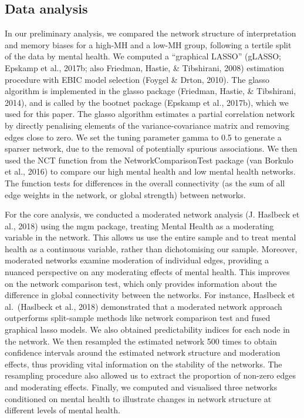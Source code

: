 \documentclass[man,floatsintext]{apa6}
\begin{document}
\hypertarget{data-analysis}{%
\subsection{Data analysis}\label{data-analysis}}

In our preliminary analysis, we compared the network structure of interpretation and memory biases for a high-MH and a low-MH group, following a tertile split of the data by mental health. We computed a \enquote{graphical LASSO} (gLASSO; Epskamp et al., 2017b; also Friedman, Hastie, \& Tibshirani, 2008) estimation procedure with EBIC model selection (Foygel \& Drton, 2010). The glasso algorithm is implemented in the glasso package (Friedman, Hastie, \& Tibshirani, 2014), and is called by the bootnet package (Epskamp et al., 2017b), which we used for this paper. The glasso algorithm estimates a partial correlation network by directly penalising elements of the variance-covariance matrix and removing edges close to zero. We set the tuning parameter gamma to 0.5 to generate a sparser network, due to the removal of potentially spurious associations. We then used the NCT function from the NetworkComparisonTest package (van Borkulo et al., 2016) to compare our high mental health and low mental health networks. The function tests for differences in the overall connectivity (as the sum of all edge weights in the network, or global strength) between networks.

For the core analysis, we conducted a moderated network analysis (J. Haslbeck et al., 2018) using the mgm package, treating Mental Health as a moderating variable in the network. This allows us use the entire sample and to treat mental health as a continuous variable, rather than dichotomising our sample. Moreover, moderated networks examine moderation of individual edges, providing a nuanced perspective on any moderating effects of mental health. This improves on the network comparison test, which only provides information about the difference in global connectivity between the networks. For instance, Haslbeck et al.~(Haslbeck et al., 2018) demonstrated that a moderated network approach outperforms split-sample methods like network comparison test and fused graphical lasso models. We also obtained predictability indices for each node in the network. We then resampled the estimated network 500 times to obtain confidence intervals around the estimated network structure and moderation effects, thus providing vital information on the stability of the networks. The resampling procedure also allowed us to extract the proportion of non-zero edges and moderating effects. Finally, we computed and visualised three networks conditioned on mental health to illustrate changes in network structure at different levels of mental health.
\end{document}
